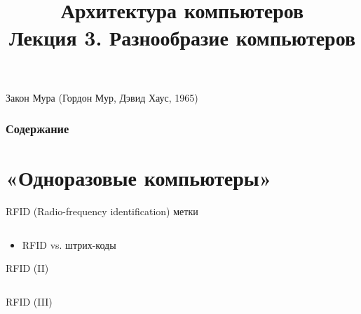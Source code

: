 \newcommand{\h}{handout,%
}



\title[Архитектура компьютеров. Лекция 3]{Архитектура компьютеров\texorpdfstring{\\}{ }Лекция 3. Разнообразие компьютеров}



\begin{frame}
\titlepage
\end{frame}

\begin{frame}[plain]{Закон Мура (Гордон Мур, Дэвид Хаус, 1965)}
\vspace{-.2cm}
\end{frame}

\begin{frame}
\frametitle{Содержание}
\tableofcontents
\end{frame}

\section {«Одноразовые компьютеры»}

\begin{frame}{RFID (Radio-frequency identification) метки}
\begin{columns}
    \column{3cm} 
    \column{5cm} 
\end{columns}
\pause
\begin{itemize}
    \item RFID vs. штрих-коды
\end{itemize}
\end{frame}

\begin{frame}{RFID (II)}
    \vspace{-.48cm}
\begin{columns}
    \column{6cm} 

    \pause{}
    \column{5cm}

    \pause{}
\end{columns}
\end{frame}

\begin{frame}{RFID (III)}
\end{frame}

